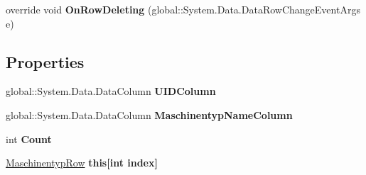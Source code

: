 \begin{DoxyCompactItemize}
\item 
override void {\bfseries On\+Row\+Deleting} (global\+::\+System.\+Data.\+Data\+Row\+Change\+Event\+Args e)\hypertarget{class_products_1_1_data_1_1ds_sage_1_1_maschinentyp_data_table_a0cc2b3fac8cdbd2d74a11b6c2edca416}{}\label{class_products_1_1_data_1_1ds_sage_1_1_maschinentyp_data_table_a0cc2b3fac8cdbd2d74a11b6c2edca416}

\end{DoxyCompactItemize}
\subsection*{Properties}
\begin{DoxyCompactItemize}
\item 
global\+::\+System.\+Data.\+Data\+Column {\bfseries U\+I\+D\+Column}\hypertarget{class_products_1_1_data_1_1ds_sage_1_1_maschinentyp_data_table_ae7e125e89fe0ce4729042fd2f9805a8b}{}\label{class_products_1_1_data_1_1ds_sage_1_1_maschinentyp_data_table_ae7e125e89fe0ce4729042fd2f9805a8b}

\item 
global\+::\+System.\+Data.\+Data\+Column {\bfseries Maschinentyp\+Name\+Column}\hypertarget{class_products_1_1_data_1_1ds_sage_1_1_maschinentyp_data_table_a6d630358515e10a2a207d74254bb63a4}{}\label{class_products_1_1_data_1_1ds_sage_1_1_maschinentyp_data_table_a6d630358515e10a2a207d74254bb63a4}

\item 
int {\bfseries Count}\hypertarget{class_products_1_1_data_1_1ds_sage_1_1_maschinentyp_data_table_a8f17162b83154cb558c70637b5650449}{}\label{class_products_1_1_data_1_1ds_sage_1_1_maschinentyp_data_table_a8f17162b83154cb558c70637b5650449}

\item 
\hyperlink{class_products_1_1_data_1_1ds_sage_1_1_maschinentyp_row}{Maschinentyp\+Row} {\bfseries this\mbox{[}int index\mbox{]}}\hypertarget{class_products_1_1_data_1_1ds_sage_1_1_maschinentyp_data_table_aff83edc90e4c738d784da49a9dd5e4a5}{}\label{class_products_1_1_data_1_1ds_sage_1_1_maschinentyp_data_table_aff83edc90e4c738d784da49a9dd5e4a5}

\end{DoxyCompactItemize}
